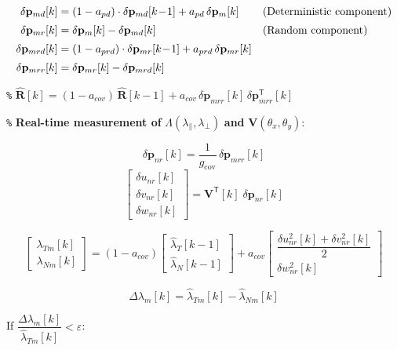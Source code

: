 \documentclass[UTF8,11pt,a4paper]{ctexart}
\newcommand{\tp}{^{\!\mathsf{T}}}
\newcommand{\VkT}{\mathbf{V}\tp\![k]}
\begin{document}
\begin{align}
{\delta}\mathbf{p}_{md}[k] &= (1-a_{pd})\cdot{\delta}\mathbf{p}_{md}[k\!-\!1]
+ a_{pd}\,\delta\mathbf{p}_m[k]
&& \text{(Deterministic component)} \notag\\[2pt]
\delta\mathbf{p}_{mr}[k] &= \delta\mathbf{p}_m[k] - {\delta}\mathbf{p}_{md}[k]
&& \text{(Random component)} \notag\\[2pt]
\delta\mathbf{p}_{mrd}[k] &= (1-a_{prd})\cdot\delta\mathbf{p}_{mr}[k\!-\!1]
+ a_{prd}\,\delta\mathbf{p}_{mr}[k] \notag\\[2pt]
\delta\mathbf{p}_{mrr}[k] &= \delta\mathbf{p}_{mr}[k] - \delta\mathbf{p}_{mrd}[k] \notag
\end{align}

\noindent\texttt{\%}
$\hat{\mathbf{R}}[k] = (1-a_{cov})\,\hat{\mathbf{R}}[k\!-\!1]
+ a_{cov}\,\delta\mathbf{p}_{mrr}[k]\,\delta\mathbf{p}_{mrr}\tp[k]$

\medskip
\noindent\texttt{\%} \textbf{Real-time measurement of} $\Lambda(\lambda_\parallel,\lambda_\perp)$
\textbf{and} $\mathbf{V}(\theta_x,\theta_y)$:

\[
\delta\mathbf{p}_{nr}[k] = \frac{1}{g_{\mathrm{cov}}}\,\delta\mathbf{p}_{mrr}[k]
\]
\[
\begin{bmatrix}\delta u_{nr}[k]\\\delta v_{nr}[k]\\\delta w_{nr}[k]\end{bmatrix}
= \VkT\;\delta\mathbf{p}_{nr}[k]
\]

\[
\begin{bmatrix}\lambda_{Tm}[k]\\\lambda_{Nm}[k]\end{bmatrix}
= (1-a_{cov})
\begin{bmatrix}\hat{\lambda}_{T}[k-1]\\\hat{\lambda}_{N}[k-1]\end{bmatrix}
+ a_{cov}
\begin{bmatrix}\dfrac{\delta u_{nr}^2[k]+\delta v_{nr}^2[k]}{2}\\\delta w_{nr}^2[k]\end{bmatrix}
\]

\[
\Delta\lambda_m[k] = \hat{\lambda}_{Tm}[k] - \hat{\lambda}_{Nm}[k]
\]

\medskip\noindent
If\; $\dfrac{\Delta\lambda_m[k]}{\hat{\lambda}_{Tm}[k]} < \varepsilon$\;:
\end{document}
